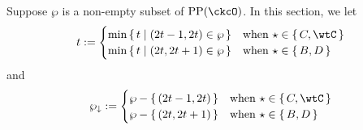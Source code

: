 \documentclass[counting_main.tex]{subfiles}
\begin{document}
Suppose $\wp$ is a non-empty subset of $\CPP(\ckcO)$. In this section, we let
\[
  t:=
  \begin{cases}
    \min\set{t|(2t-1,2t)\in \wp} & \text{when $\star \in \set{C,\wtC}$}\\
    \min\set{t|(2t,2t+1)\in \wp} & \text{when $\star \in \set{B,D}$}\\
  \end{cases}
\]
and
\[
  \PPm:=
  \begin{cases}
    \wp - \set{(2t-1,2t)}  & \text{when $\star \in \set{C,\wtC}$}\\
    \wp -  \set{(2t,2t+1)} & \text{when $\star \in \set{B,D}$}\\
  \end{cases}
\]
\end{document}
